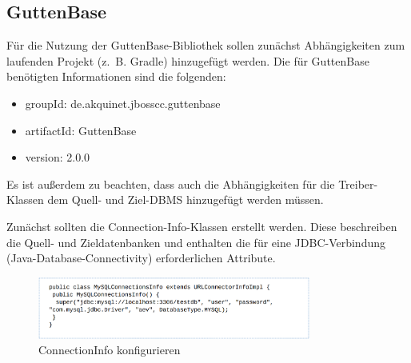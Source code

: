 \subsection{GuttenBase}
	\label{sec:imp:gb}
	Für die Nutzung der GuttenBase-Bibliothek sollen zunächst Abhängigkeiten zum laufenden Projekt (z. B. Gradle) hinzugefügt werden. Die für GuttenBase benötigten Informationen sind die folgenden:
	\begin{itemize}
		\item groupId: de.akquinet.jbosscc.guttenbase
		\item artifactId: GuttenBase
		\item version: 2.0.0
	\end{itemize}
	Es ist außerdem zu beachten, dass auch die Abhängigkeiten für die Treiber-Klassen dem Quell- und Ziel-DBMS hinzugefügt werden müssen.
	
	Zunächst sollten die Connection-Info-Klassen erstellt werden. Diese beschreiben die Quell- und Zieldatenbanken und enthalten die für eine JDBC-Verbindung (Java-Database-Connectivity) erforderlichen Attribute.\\
	\begin{figure}[H]
		\centering
		\includegraphics[width=0.8\textwidth]{images/gb/conInfo}
		\caption{ConnectionInfo konfigurieren}
		\label{img:gb/conInfo}
	\end{figure}
	
